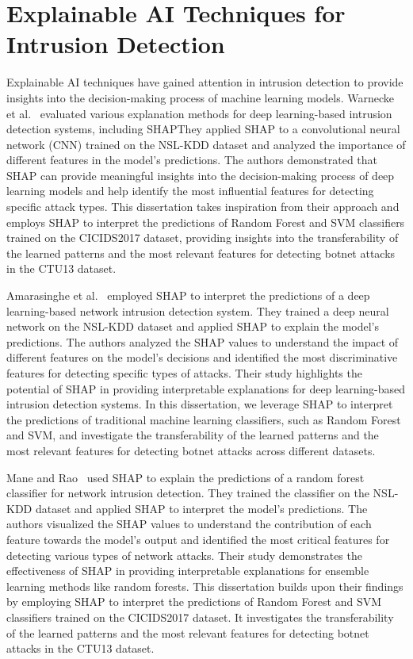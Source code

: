 \section{Explainable AI Techniques for Intrusion Detection}

Explainable AI techniques have gained attention in intrusion detection to provide insights into the decision-making process of machine learning models. Warnecke et al.~\cite{warnecke2020evaluating} evaluated various explanation methods for deep learning-based intrusion detection systems, including SHAP\@ They applied SHAP to a convolutional neural network (CNN) trained on the NSL-KDD dataset and analyzed the importance of different features in the model's predictions. The authors demonstrated that SHAP can provide meaningful insights into the decision-making process of deep learning models and help identify the most influential features for detecting specific attack types. This dissertation takes inspiration from their approach and employs SHAP to interpret the predictions of Random Forest and SVM classifiers trained on the CICIDS2017 dataset, providing insights into the transferability of the learned patterns and the most relevant features for detecting botnet attacks in the CTU13 dataset.

Amarasinghe et al.~\cite{amarasinghe2018toward} employed SHAP to interpret the predictions of a deep learning-based network intrusion detection system. They trained a deep neural network on the NSL-KDD dataset and applied SHAP to explain the model's predictions. The authors analyzed the SHAP values to understand the impact of different features on the model's decisions and identified the most discriminative features for detecting specific types of attacks. Their study highlights the potential of SHAP in providing interpretable explanations for deep learning-based intrusion detection systems. In this dissertation, we leverage SHAP to interpret the predictions of traditional machine learning classifiers, such as Random Forest and SVM, and investigate the transferability of the learned patterns and the most relevant features for detecting botnet attacks across different datasets.

Mane and Rao~\cite{mane2021explaining} used SHAP to explain the predictions of a random forest classifier for network intrusion detection. They trained the classifier on the NSL-KDD dataset and applied SHAP to interpret the model's predictions. The authors visualized the SHAP values to understand the contribution of each feature towards the model's output and identified the most critical features for detecting various types of network attacks. Their study demonstrates the effectiveness of SHAP in providing interpretable explanations for ensemble learning methods like random forests. This dissertation builds upon their findings by employing SHAP to interpret the predictions of Random Forest and SVM classifiers trained on the CICIDS2017 dataset. It investigates the transferability of the learned patterns and the most relevant features for detecting botnet attacks in the CTU13 dataset.


